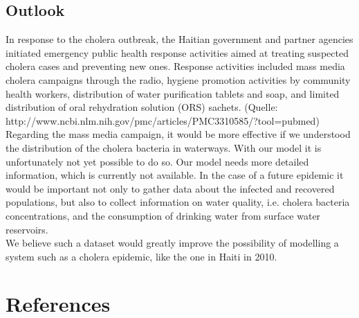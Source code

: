 \documentclass[11pt]{article}
\begin{document}
\subsection{Outlook}
In response to the cholera outbreak, the Haitian government and partner agencies initiated emergency public health response activities aimed at treating suspected cholera cases and preventing new ones. Response activities included mass media cholera campaigns through the radio, hygiene promotion activities by community health workers, distribution of water purification tablets and soap, and limited distribution of oral rehydration solution (ORS) sachets. (Quelle: http://www.ncbi.nlm.nih.gov/pmc/articles/PMC3310585/?tool=pubmed)
Regarding the mass media campaign, it would be more effective if we understood the distribution of the cholera bacteria in waterways. With our model it is unfortunately not yet possible to do so. Our model needs more detailed information, which is currently not available. In the case of a future epidemic it would be important not only to gather data about the infected and recovered populations, but also to collect information on water quality, i.e. cholera bacteria concentrations, and the consumption of drinking water from surface water reservoirs.\\
We believe such a dataset would greatly improve the possibility of modelling a system such as a cholera epidemic, like the one in Haiti in 2010.

\section{References}


\end{document}
